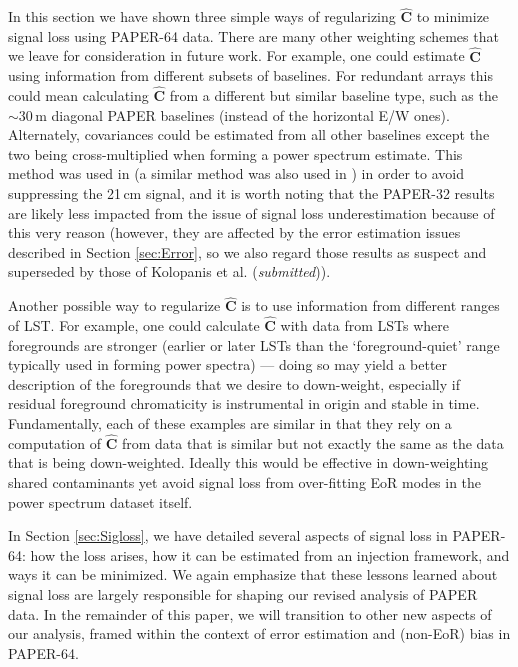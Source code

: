 \documentclass[preprint2,numberedappendix,tighten]{aastex6}
\begin{document}
In this section we have shown three simple ways of regularizing $\widehat{\textbf{C}}$ to minimize signal loss using PAPER-64 
data. There are many other weighting schemes that we leave for consideration in future work. For example, one could estimate 
$\widehat{\textbf{C}}$ using information from different subsets of baselines. For redundant arrays this could mean calculating $
\widehat{\textbf{C}}$ from a different but similar baseline type, such as the $\sim30$\,m diagonal PAPER baselines (instead of the 
horizontal E/W ones). Alternately, covariances could be estimated from all other baselines except the two being cross-multiplied 
when forming a power spectrum estimate. This method was used in \citet{parsons_et_al2014} (a similar method was also used in \citet{dillon_et_al2015}) in order to avoid suppressing the 
21\,cm signal, and it is worth noting that the PAPER-32 results are likely less impacted from the issue of signal loss underestimation 
because of this very reason (however, they are affected by the error estimation issues described in Section \ref{sec:Error}, so 
we also regard those results as suspect and superseded by those of Kolopanis et al. (\textit{submitted})).

Another possible way to regularize $\widehat{\textbf{C}}$ is to use information from different ranges of LST. For example, one could 
calculate $\widehat{\textbf{C}}$ with data from LSTs where foregrounds are stronger (earlier or later LSTs than the `foreground-quiet' range typically used in forming power spectra) --- doing so may yield a better description of the foregrounds that we desire to 
down-weight, especially if residual foreground chromaticity is instrumental in origin and stable in time. Fundamentally, each of these examples are similar in that they rely on a computation of $\widehat{\textbf{C}}$ from 
data that is similar but not exactly the same as the data that is being down-weighted. Ideally this would be effective in down-weighting shared contaminants yet avoid signal loss from over-fitting EoR modes in the power spectrum dataset itself. 

In Section \ref{sec:Sigloss}, we have detailed several aspects of signal loss in PAPER-64: how the loss arises, how it can be estimated from an injection framework, and ways it can be minimized. We again emphasize that these lessons learned about signal loss are largely responsible for shaping our revised analysis of PAPER data. In the remainder of this paper, we will transition to other new aspects of our analysis, framed within the context of error estimation and (non-EoR) bias in PAPER-64.
\end{document}
